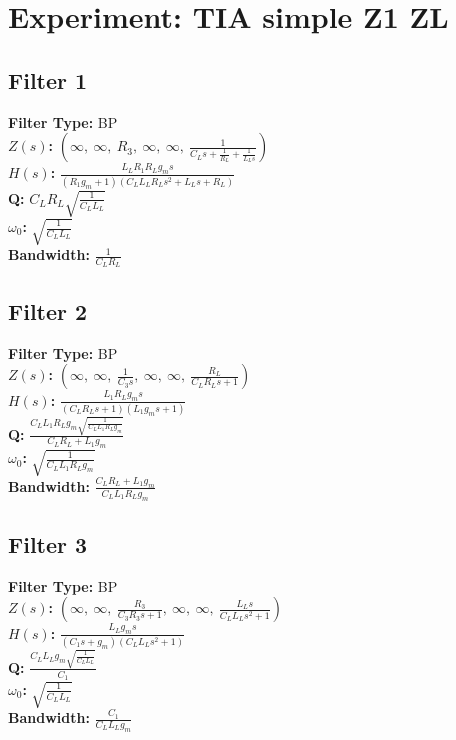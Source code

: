 \documentclass{article}
\begin{document}
        \section*{Experiment: TIA simple Z1 ZL}
\subsection*{Filter 1}
\textbf{Filter Type:} BP \\ 
\textbf{$Z(s)$:} $\left( \infty, \  \infty, \  R_{3}, \  \infty, \  \infty, \  \frac{1}{C_{L} s + \frac{1}{R_{L}} + \frac{1}{L_{L} s}}\right)$ \\ 
\textbf{$H(s)$:} $\frac{L_{L} R_{1} R_{L} g_{m} s}{\left(R_{1} g_{m} + 1\right) \left(C_{L} L_{L} R_{L} s^{2} + L_{L} s + R_{L}\right)}$ \\ 
\textbf{Q:} $C_{L} R_{L} \sqrt{\frac{1}{C_{L} L_{L}}}$ \\ 
\textbf{$\omega_0$:} $\sqrt{\frac{1}{C_{L} L_{L}}}$ \\ 
\textbf{Bandwidth:} $\frac{1}{C_{L} R_{L}}$ \\ 
\subsection*{Filter 2}
\textbf{Filter Type:} BP \\ 
\textbf{$Z(s)$:} $\left( \infty, \  \infty, \  \frac{1}{C_{3} s}, \  \infty, \  \infty, \  \frac{R_{L}}{C_{L} R_{L} s + 1}\right)$ \\ 
\textbf{$H(s)$:} $\frac{L_{1} R_{L} g_{m} s}{\left(C_{L} R_{L} s + 1\right) \left(L_{1} g_{m} s + 1\right)}$ \\ 
\textbf{Q:} $\frac{C_{L} L_{1} R_{L} g_{m} \sqrt{\frac{1}{C_{L} L_{1} R_{L} g_{m}}}}{C_{L} R_{L} + L_{1} g_{m}}$ \\ 
\textbf{$\omega_0$:} $\sqrt{\frac{1}{C_{L} L_{1} R_{L} g_{m}}}$ \\ 
\textbf{Bandwidth:} $\frac{C_{L} R_{L} + L_{1} g_{m}}{C_{L} L_{1} R_{L} g_{m}}$ \\ 
\subsection*{Filter 3}
\textbf{Filter Type:} BP \\ 
\textbf{$Z(s)$:} $\left( \infty, \  \infty, \  \frac{R_{3}}{C_{3} R_{3} s + 1}, \  \infty, \  \infty, \  \frac{L_{L} s}{C_{L} L_{L} s^{2} + 1}\right)$ \\ 
\textbf{$H(s)$:} $\frac{L_{L} g_{m} s}{\left(C_{1} s + g_{m}\right) \left(C_{L} L_{L} s^{2} + 1\right)}$ \\ 
\textbf{Q:} $\frac{C_{L} L_{L} g_{m} \sqrt{\frac{1}{C_{L} L_{L}}}}{C_{1}}$ \\ 
\textbf{$\omega_0$:} $\sqrt{\frac{1}{C_{L} L_{L}}}$ \\ 
\textbf{Bandwidth:} $\frac{C_{1}}{C_{L} L_{L} g_{m}}$ \\ 
\end{document}
